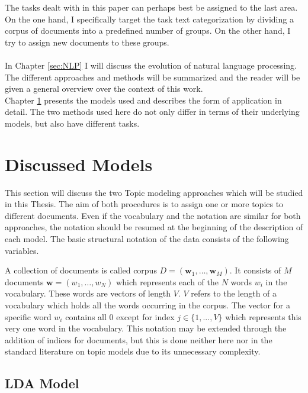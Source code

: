 \documentclass[11pt,a4paper]{article}
\begin{document}
The tasks dealt with in this paper can perhaps best be assigned to the last area. On the one hand, I specifically target the task text categorization by dividing a corpus of documents into a predefined number of groups. On the other hand, I try to assign new documents to these groups.\\
\ \\
In Chapter \ref{sec:NLP} I will discuss the evolution of natural language processing. The different approaches and methods will be summarized and the reader will be given a general overview over the context of this work.\\
Chapter \ref{sec:Models} presents the models used and describes the form of application in detail. The two methods used here do not only differ in terms of their underlying models, but also have different tasks.












\section{Discussed Models} \label{sec:Models}

This section will discuss the two Topic modeling approaches which will be studied in this Thesis. The aim of both procedures is to assign one or more topics to different documents. Even if the vocabulary and the notation are similar for both approaches, the notation should be resumed at the beginning of the description of each model. The basic structural notation of the data consists of the following variables.

A collection of documents is called corpus $D=(\textbf{w}_1,\dots , \textbf{w}_M)$. It consists of $M$ documents $\textbf{w}=(w_1,\dots, w_N)$ which represents each of the $N$ words $w_i$ in the vocabulary. These words are vectors of length $V$. $V$ refers to the length of a vocabulary which holds all the words occurring in the corpus. The vector for a specific word $w_i$ contains all 0 except for index $j\in\{1,...,V\}$ which represents this very one word in the vocabulary.
This notation may be extended through the addition of indices for documents, but this is done neither here nor in the standard literature on topic models due to its unnecessary complexity.


\subsection{LDA Model}\label{sec:LDA}
\end{document}
